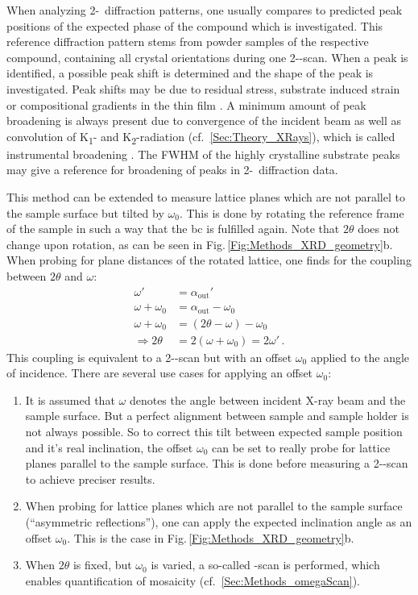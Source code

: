 When analyzing 2\texttheta-\textomega\ diffraction patterns, one usually compares to predicted peak positions of the expected phase of the compound which is investigated.
This reference diffraction pattern stems from powder samples of the respective compound, containing all crystal orientations during one 2\texttheta-\textomega-scan.
When a peak is identified, a possible peak shift is determined and the shape of the peak is investigated.
Peak shifts may be due to residual stress, substrate induced strain or compositional gradients in the thin film 
    \cite{harrington2021}.
A minimum amount of peak broadening is always present due to convergence of the incident beam as well as convolution of K\textalpha\textsubscript{1}- and K\textalpha\textsubscript{2}-radiation (cf.~\ref{Sec:Theory_XRays}), which is called instrumental broadening
    \cite{harrington2021}.
The \gls{FWHM} of the highly crystalline substrate peaks may give a reference for broadening of peaks in 2\texttheta-\textomega\ diffraction data.  

This method can be extended to measure lattice planes which are not parallel to the sample surface but tilted by $\omega_0$.
This is done by rotating the reference frame of the sample in such a way that the \gls{bc} is fulfilled again.
Note that $2\theta$ does not change upon rotation, as can be seen in Fig.\,\ref{Fig:Methods_XRD_geometry}b.
When probing for plane distances of the rotated lattice, one finds for the coupling between $2\theta$ and $\omega$:
\begin{align*}
    \omega'&=\alpha_\mathrm{out}'\\
    \omega+\omega_0&=\alpha_\mathrm{out}-\omega_0\\
    \omega+\omega_0&=(2\theta-\omega)-\omega_0\\
    \Rightarrow 2\theta&=2(\omega+\omega_0)=2\omega'\,.
\end{align*}
This coupling is equivalent to a 2\texttheta-\textomega-scan but with an offset $\omega_0$ applied to the angle of incidence.
There are several use cases for applying an offset $\omega_0$:
\begin{enumerate}[label=(\roman*)]
    \item It is assumed that $\omega$ denotes the angle between incident X-ray beam and the sample surface.
    But a perfect alignment between sample and sample holder is not always possible.
    So to correct this tilt between expected sample position and it's real inclination, the offset $\omega_0$ can be set to really probe for lattice planes parallel to the sample surface.
    This is done before measuring a 2\texttheta-\textomega-scan to achieve preciser results.
    \item When probing for lattice planes which are not parallel to the sample surface (\enquote{asymmetric reflections}), one can apply the expected inclination angle as an offset $\omega_0$.
    This is the case in Fig.\,\ref{Fig:Methods_XRD_geometry}b.
    \item When $2\theta$ is fixed, but $\omega_0$ is varied, a so-called \textomega-scan is performed, which enables quantification of mosaicity (cf.~\ref{Sec:Methods_omegaScan}).
\end{enumerate}

